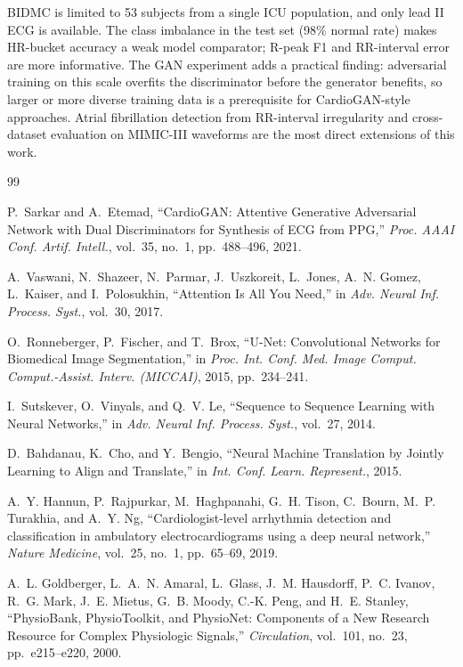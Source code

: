 \documentclass[11pt,a4paper]{article}
\begin{document}
BIDMC is limited to 53 subjects from a single ICU population, and only lead II ECG is available. The class imbalance in the test set (98\% normal rate) makes HR-bucket accuracy a weak model comparator; R-peak F1 and RR-interval error are more informative. The GAN experiment adds a practical finding: adversarial training on this scale overfits the discriminator before the generator benefits, so larger or more diverse training data is a prerequisite for CardioGAN-style approaches. Atrial fibrillation detection from RR-interval irregularity and cross-dataset evaluation on MIMIC-III waveforms are the most direct extensions of this work.

\begin{thebibliography}{99}

P.~Sarkar and A.~Etemad,
``CardioGAN: Attentive Generative Adversarial Network with Dual Discriminators for Synthesis of ECG from PPG,''
\textit{Proc. AAAI Conf. Artif. Intell.}, vol.~35, no.~1, pp.~488--496, 2021.

A.~Vaswani, N.~Shazeer, N.~Parmar, J.~Uszkoreit, L.~Jones, A.~N. Gomez, L.~Kaiser, and I.~Polosukhin,
``Attention Is All You Need,''
in \textit{Adv. Neural Inf. Process. Syst.}, vol.~30, 2017.

O.~Ronneberger, P.~Fischer, and T.~Brox,
``U-Net: Convolutional Networks for Biomedical Image Segmentation,''
in \textit{Proc. Int. Conf. Med. Image Comput. Comput.-Assist. Interv. (MICCAI)}, 2015, pp.~234--241.

I.~Sutskever, O.~Vinyals, and Q.~V. Le,
``Sequence to Sequence Learning with Neural Networks,''
in \textit{Adv. Neural Inf. Process. Syst.}, vol.~27, 2014.

D.~Bahdanau, K.~Cho, and Y.~Bengio,
``Neural Machine Translation by Jointly Learning to Align and Translate,''
in \textit{Int. Conf. Learn. Represent.}, 2015.

A.~Y. Hannun, P.~Rajpurkar, M.~Haghpanahi, G.~H. Tison, C.~Bourn, M.~P. Turakhia, and A.~Y. Ng,
``Cardiologist-level arrhythmia detection and classification in ambulatory electrocardiograms using a deep neural network,''
\textit{Nature Medicine}, vol.~25, no.~1, pp.~65--69, 2019.

A.~L. Goldberger, L.~A.~N. Amaral, L.~Glass, J.~M. Hausdorff, P.~C. Ivanov, R.~G. Mark, J.~E. Mietus, G.~B. Moody, C.-K. Peng, and H.~E. Stanley,
``PhysioBank, PhysioToolkit, and PhysioNet: Components of a New Research Resource for Complex Physiologic Signals,''
\textit{Circulation}, vol.~101, no.~23, pp.~e215--e220, 2000.


\end{thebibliography}
\end{document}
